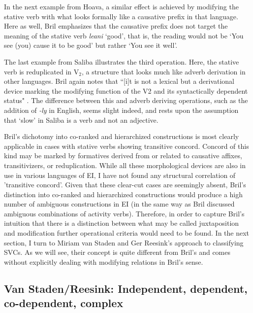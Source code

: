 In the next example from Hoava, a similar effect is achieved by modifying the stative verb with what looks formally like a causative prefix in that language. Here as well, Bril emphasizes that the causative prefix does not target the meaning of the stative verb \textit{leani} `good', that is, the reading would not be `You see (you) cause it to be good' but rather `You see it well'.

The last example from Saliba illustrates the third operation. Here, the stative verb is reduplicated in V$_2$, a structure that looks much like adverb derivation in other languages. Bril again notes that ``[i]t is not a lexical but a derivational device marking the modifying function of the V2 and its syntactically dependent status" \citep[273]{bril2007nexus}. The difference between this and adverb deriving operations, such as the addition of \textit{-ly} in English, seems slight indeed, and rests upon the assumption that `slow' in Saliba is a verb and not an adjective.

Bril's dichotomy into co-ranked and hierarchized constructions is most clearly applicable in cases with stative verbs showing transitive concord. Concord of this kind may be marked by formatives derived from or related to causative affixes, transitivizers, or reduplication. While all these morphological devices are also in use in various languages of EI, I have not found any structural correlation of 'transitive concord'. Given that these clear-cut cases are seemingly absent, Bril's distinction into co-ranked and hierarchized constructions would produce a high number of ambiguous constructions in EI (in the same way as Bril discussed ambiguous combinations of activity verbs). Therefore, in order to capture Bril's intuition that there is a distinction between what may be called juxtaposition and modification further operational criteria would need to be found. In the next section, I turn to Miriam van Staden and Ger Reesink's approach to classifying SVCs. As we will see, their concept is quite different from Bril's and comes without explicitly dealing with modifying relations in Bril's sense.

\subsection[Van Staden/Reesink: Independent, dependent, ...]{Van Staden/Reesink: Independent, dependent, co-dependent, complex%
}

